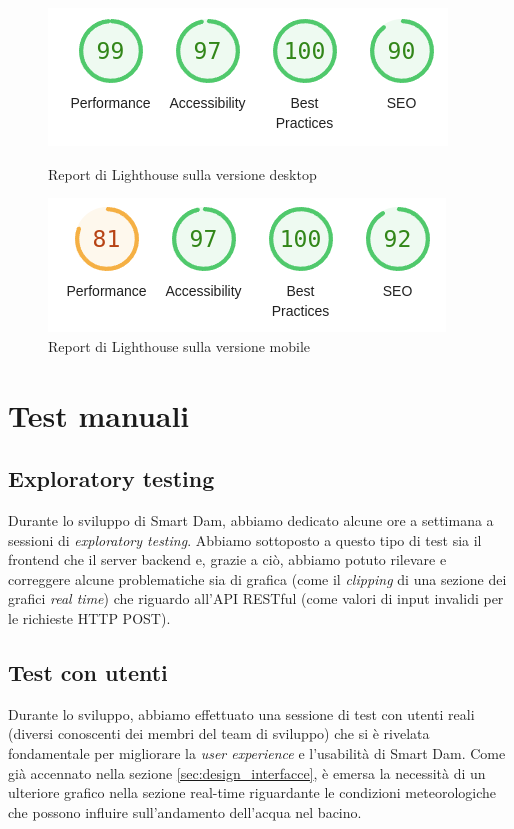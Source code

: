 \documentclass[a4paper,12pt]{report}
\begin{document}
\begin{figure}
	\centering
	\begin{minipage}{0.45\textwidth}
		\includegraphics[scale=0.5]{lighthouse_report_desktop}
		\caption{Report di Lighthouse sulla versione desktop}
		\label{fig:lighthouse_report_desktop}
	\end{minipage}
	\hfill
	\begin{minipage}{0.45\textwidth}
		\includegraphics[scale=0.5]{lighthouse_report_mobile}
		\caption{Report di Lighthouse sulla versione mobile}
		\label{fig:lighthouse_report_mobile}
	\end{minipage}
\end{figure}

\section{Test manuali}
\subsection{Exploratory testing}
Durante lo sviluppo di Smart Dam, abbiamo dedicato alcune ore a settimana a sessioni di \emph{exploratory testing}. Abbiamo sottoposto a questo tipo di test sia il frontend che il server backend e, grazie a ciò, abbiamo potuto rilevare e correggere alcune problematiche sia di grafica (come il \emph{clipping} di una sezione dei grafici \emph{real time}) che riguardo all'API RESTful (come valori di input invalidi per le richieste HTTP POST).

\subsection{Test con utenti}
Durante lo sviluppo, abbiamo effettuato una sessione di test con utenti reali (diversi conoscenti dei membri del team di sviluppo) che si è rivelata fondamentale per migliorare la \emph{user experience} e l'usabilità di Smart Dam. Come già accennato nella sezione \ref{sec:design_interfacce}, è emersa la necessità di un ulteriore grafico nella sezione real-time riguardante le condizioni meteorologiche che possono influire sull'andamento dell'acqua nel bacino.
\end{document}
